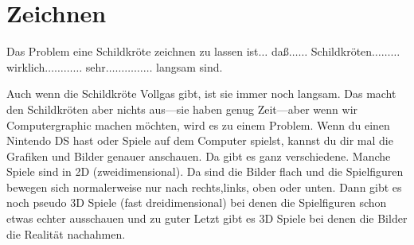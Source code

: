 

\chapter{Zeichnen}\label{ch:abitgraphic}

Das Problem eine Schildkröte zeichnen zu lassen ist$\ldots$ daß$\ldots$$\ldots$ Schildkröten$\ldots$$\ldots$$\ldots$ wirklich$\ldots$$\ldots$$\ldots$$\ldots$ sehr$\ldots$$\ldots$$\ldots$$\ldots$$\ldots$ langsam sind.
\par
Auch wenn die Schildkröte Vollgas gibt, ist sie immer noch langsam. Das macht den Schildkröten aber nichts aus---sie haben genug Zeit---aber wenn wir Computergraphic machen möchten, wird es zu einem Problem. Wenn du einen Nintendo DS hast oder Spiele auf dem Computer spielst, kannst du dir mal die Grafiken und Bilder genauer anschauen. Da gibt es ganz verschiedene. Manche Spiele sind in 2D (zweidimensional). Da sind die Bilder flach und die Spielfiguren bewegen sich normalerweise nur nach rechts,links, oben oder unten. Dann gibt es noch pseudo 3D Spiele (fast dreidimensional) bei denen die Spielfiguren schon etwas echter ausschauen und zu guter Letzt gibt es 3D Spiele bei denen die Bilder die Realität nachahmen. 

